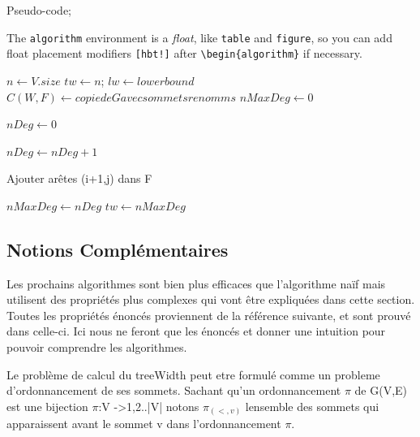 \documentclass[a4paper, 12pt]{article}
\begin{document}
Pseudo-code;

The \verb|algorithm| environment is a \emph{float}, like \verb|table| and \verb|figure|, so you can add float placement modifiers \verb|[hbt!]| after \verb|\begin{algorithm}| if necessary.

\begin{algorithm}[hbt!]
\caption{Naive Algorithm Tree Width}\label{alg:tree_width}
\begin{algorithmic}
  \State $n \gets V.size$
  \State $tw \gets n$;
  \State $lw \gets lowerbound$
    \State $C(W,F) \gets copie de G avec sommets renomms$
    \State $nMaxDeg \gets 0$

     \do
      \State $nDeg \gets 0$
       \do
        
          
          \State $nDeg \gets nDeg + 1$

            \State Ajouter arêtes (i+1,j) dans F
          \EndIf
        \EndIf
      \EndFor

        \State $nMaxDeg \gets nDeg$
      \EndIf
    \EndFor
      \State $tw \gets nMaxDeg$
    \EndIf
  \EndFor

\end{algorithmic}
\end{algorithm}

\subsection{Notions Complémentaires}

Les prochains algorithmes sont bien plus efficaces que l'algorithme naïf 
mais utilisent des propriétés plus complexes qui vont être expliquées 
dans cette section. Toutes les propriétés énoncés proviennent de la 
référence suivante, et sont prouvé dans celle-ci. Ici nous ne feront que 
les énoncés et donner une intuition pour pouvoir comprendre les algorithmes.

Le problème de calcul du treeWidth peut etre formulé comme un probleme
d'ordonnancement de ses sommets.
Sachant qu'un ordonnancement $\pi$ de G(V,E) est une bijection 
$\pi$:V ->{1,2..|V|} notons $\pi_{(<,v)}$ lensemble des sommets qui 
apparaissent avant le sommet v dans l'ordonnancement $\pi$.
\end{document}
